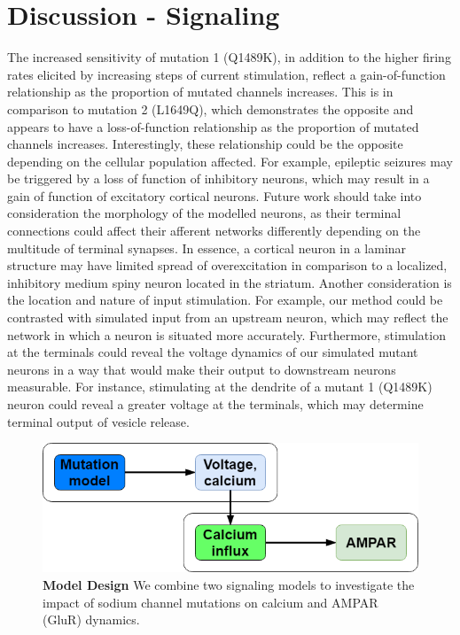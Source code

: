 \section{Discussion - Signaling}
The increased sensitivity of mutation 1 (Q1489K), in addition to the higher firing rates elicited by
increasing steps of current stimulation, reflect a gain-of-function relationship as the proportion
of mutated channels increases. This is in comparison to mutation 2 (L1649Q), which demonstrates the
opposite and appears to have a loss-of-function relationship as the proportion of mutated channels
increases. Interestingly, these relationship could be the opposite depending on the cellular
population affected. For example, epileptic seizures may be triggered by a loss of function of
inhibitory neurons, which may result in a gain of function of excitatory cortical neurons. Future
work should take into consideration the morphology of the modelled neurons, as their terminal
connections could affect their afferent networks differently depending on the multitude of terminal
synapses. In essence, a cortical neuron in a laminar structure may have limited spread of
overexcitation in comparison to a localized, inhibitory medium spiny neuron located in the striatum.
Another consideration is the location and nature of input stimulation. For example, our method could
be contrasted with simulated input from an upstream neuron, which may reflect the network in which a
neuron is situated more accurately. Furthermore, stimulation at the terminals could reveal the
voltage dynamics of our simulated mutant neurons in a way that would make their output to downstream
neurons measurable. For instance, stimulating at the dendrite of a mutant 1 (Q1489K) neuron could
reveal a greater voltage at the terminals, which may determine terminal output of vesicle release.


\begin{figure}[!!h]
    \centering
    \includegraphics[width=\textwidth]{images/schematic.png}
    \caption{\textbf{Model Design} We combine two signaling models to investigate the impact of sodium channel mutations on calcium and AMPAR (GluR) dynamics.}
    \label{schematic}
\end{figure}

